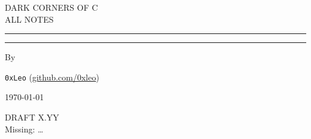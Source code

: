 \begin{titlepage}
	\vspace{0.75\baselineskip} %
	
	{\LARGE DARK CORNERS OF C\\ALL NOTES} %
	
	\vspace{0.75\baselineskip} %
	
	\rule{\textwidth}{0.4pt}\vspace*{-\baselineskip}\vspace{3.2pt} %
	\rule{\textwidth}{1.6pt} %
	
	\vspace{2\baselineskip} %
	

	
	\vspace*{3\baselineskip} %
	

	
	\vspace*{3\baselineskip} %
	
	
	By
	
	\vspace{0.5\baselineskip} %
	
	{\normalfont \Large \texttt{0xLeo} (\url{github.com/0xleo}) \\} %
	
	\vspace{0.5\baselineskip} %
	
	
	\vfill %
	
	
	
	\vspace{0.3\baselineskip} %
	
	\today %
	
	{DRAFT X.YY} %
	{\\Missing: \ldots}

\end{titlepage}

